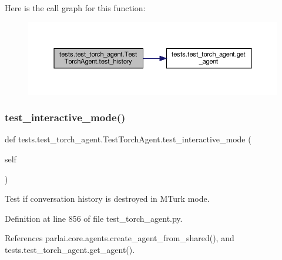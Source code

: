 Here is the call graph for this function\+:
\nopagebreak
\begin{figure}[H]
\begin{center}
\leavevmode
\includegraphics[width=350pt]{classtests_1_1test__torch__agent_1_1TestTorchAgent_a3c5504828399a2bb0d776baf1a744f71_cgraph}
\end{center}
\end{figure}
\mbox{\label{classtests_1_1test__torch__agent_1_1TestTorchAgent_aadf263b222e27bfd83d568148683a8e0}} 
\subsubsection{\texorpdfstring{test\+\_\+interactive\+\_\+mode()}{test\_interactive\_mode()}}
{\footnotesize\ttfamily def tests.\+test\+\_\+torch\+\_\+agent.\+Test\+Torch\+Agent.\+test\+\_\+interactive\+\_\+mode (\begin{DoxyParamCaption}\item[{}]{self }\end{DoxyParamCaption})}

\begin{DoxyVerb}Test if conversation history is destroyed in MTurk mode.\end{DoxyVerb}
 

Definition at line 856 of file test\+\_\+torch\+\_\+agent.\+py.



References parlai.\+core.\+agents.\+create\+\_\+agent\+\_\+from\+\_\+shared(), and tests.\+test\+\_\+torch\+\_\+agent.\+get\+\_\+agent().

